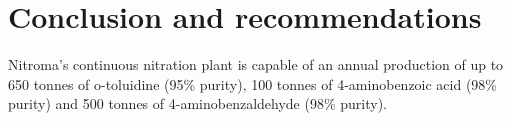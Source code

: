 \section*{Conclusion and recommendations}
Nitroma's continuous nitration plant is capable of an annual production of up to 650 tonnes of o-toluidine (95\% purity), 100 tonnes of 4-aminobenzoic acid (98\% purity) and 500 tonnes of 4-aminobenzaldehyde (98\% purity).  